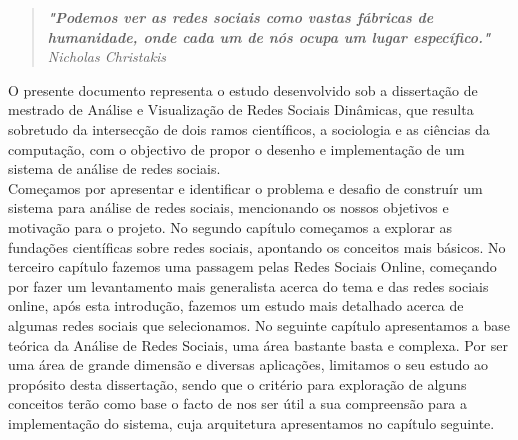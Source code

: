 
\begin{quote}
\textit{\textbf{"Podemos ver as redes sociais como vastas fábricas de humanidade, onde cada um de nós ocupa um lugar específico."} Nicholas Christakis}
\end{quote}

O presente documento representa o estudo desenvolvido sob a dissertação de mestrado de Análise e Visualização de Redes Sociais Dinâmicas, que resulta sobretudo da intersecção de dois ramos científicos, a sociologia e as ciências da computação, com o objectivo de propor o desenho e implementação de um sistema de análise de redes sociais.\\

\indent Começamos por apresentar e identificar o problema e desafio de construír um sistema para análise de redes sociais, mencionando os nossos objetivos e motivação para o projeto. No segundo capítulo começamos a explorar as fundações científicas sobre redes sociais, apontando os conceitos mais básicos. No terceiro capítulo fazemos uma passagem pelas Redes Sociais Online, começando por fazer um levantamento mais generalista acerca do tema e das redes sociais online, após esta introdução, fazemos um estudo mais detalhado acerca de algumas redes sociais que selecionamos. No seguinte capítulo apresentamos a base teórica  da Análise de Redes Sociais, uma área bastante basta e complexa. Por ser uma área de grande dimensão e diversas aplicações, limitamos o seu estudo ao propósito desta dissertação, sendo que o critério para exploração de alguns conceitos terão como base o facto de nos ser útil a sua compreensão para a implementação do sistema, cuja arquitetura apresentamos no capítulo seguinte.\\

